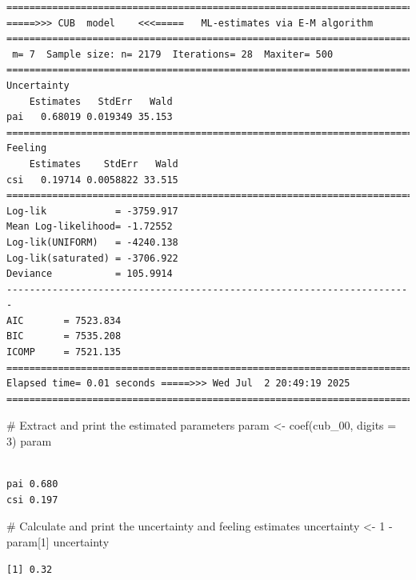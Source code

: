 \documentclass[
  letterpaper,
  DIV=11,
  numbers=noendperiod]{scrartcl}
\newenvironment{Shaded}{\begin{snugshade}}{\end{snugshade}}
\newcommand{\AttributeTok}[1]{\textcolor[rgb]{0.40,0.45,0.13}{#1}}
\newcommand{\CommentTok}[1]{\textcolor[rgb]{0.37,0.37,0.37}{#1}}
\newcommand{\DecValTok}[1]{\textcolor[rgb]{0.68,0.00,0.00}{#1}}
\newcommand{\FunctionTok}[1]{\textcolor[rgb]{0.28,0.35,0.67}{#1}}
\newcommand{\NormalTok}[1]{\textcolor[rgb]{0.00,0.23,0.31}{#1}}
\newcommand{\OtherTok}[1]{\textcolor[rgb]{0.00,0.23,0.31}{#1}}
\newcommand{\SpecialCharTok}[1]{\textcolor[rgb]{0.37,0.37,0.37}{#1}}
\begin{document}
\begin{verbatim}
======================================================================= 
=====>>> CUB  model    <<<=====   ML-estimates via E-M algorithm   
======================================================================= 
 m= 7  Sample size: n= 2179  Iterations= 28  Maxiter= 500 
======================================================================= 
Uncertainty                                            
    Estimates   StdErr   Wald
pai   0.68019 0.019349 35.153
======================================================================= 
Feeling                                            
    Estimates    StdErr   Wald
csi   0.19714 0.0058822 33.515
======================================================================= 
Log-lik            = -3759.917 
Mean Log-likelihood= -1.72552 
Log-lik(UNIFORM)   = -4240.138 
Log-lik(saturated) = -3706.922 
Deviance           = 105.9914 
----------------------------------------------------------------------- 
AIC       = 7523.834 
BIC       = 7535.208 
ICOMP     = 7521.135 
======================================================================= 
Elapsed time= 0.01 seconds =====>>> Wed Jul  2 20:49:19 2025 
======================================================================= 
\end{verbatim}

\begin{Shaded}
\begin{Highlighting}[]
\CommentTok{\# Extract and print the estimated parameters}
\NormalTok{param }\OtherTok{\textless{}{-}} \FunctionTok{coef}\NormalTok{(cub\_00, }\AttributeTok{digits =} \DecValTok{3}\NormalTok{)}
\NormalTok{param}
\end{Highlighting}
\end{Shaded}

\begin{verbatim}
         
pai 0.680
csi 0.197
\end{verbatim}

\begin{Shaded}
\begin{Highlighting}[]
\CommentTok{\# Calculate and print the uncertainty and feeling estimates}
\NormalTok{uncertainty }\OtherTok{\textless{}{-}} \DecValTok{1} \SpecialCharTok{{-}}\NormalTok{ param[}\DecValTok{1}\NormalTok{]}
\NormalTok{uncertainty}
\end{Highlighting}
\end{Shaded}

\begin{verbatim}
[1] 0.32
\end{verbatim}
\end{document}
